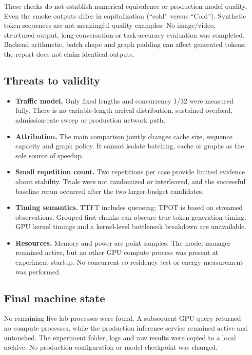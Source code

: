 \documentclass[10pt,a4paper]{article}
\begin{document}
These checks do not establish numerical equivalence or production model quality.
Even the smoke outputs differ in capitalization (``cold'' versus ``Cold'').
Synthetic token sequences are not meaningful quality examples. No image/video,
structured-output, long-conversation or task-accuracy evaluation was completed.
Backend arithmetic, batch shape and graph padding can affect generated tokens;
the report does not claim identical outputs.

\subsection{Threats to validity}
\begin{itemize}
\item \textbf{Traffic model.} Only fixed lengths and concurrency 1/32 were measured
fully. There is no variable-length arrival distribution, sustained overload,
admission-rate sweep or production network path.
\item \textbf{Attribution.} The main comparison jointly changes cache size,
sequence capacity and graph policy. It cannot isolate batching, cache or graphs
as the sole source of speedup.
\item \textbf{Small repetition count.} Two repetitions per case provide limited
evidence about stability. Trials were not randomized or interleaved, and the
successful baseline rerun occurred after the two larger-budget candidates.
\item \textbf{Timing semantics.} TTFT includes queueing; TPOT is based on streamed
observations. Grouped first chunks can obscure true token-generation timing.
GPU kernel timings and a kernel-level bottleneck breakdown are unavailable.
\item \textbf{Resources.} Memory and power are point samples. The model manager
remained active, but no other GPU compute process was present at experiment
startup. No concurrent co-residency test or energy measurement was performed.
\end{itemize}

\subsection{Final machine state}
No remaining live lab processes were found. A subsequent GPU query returned
no compute processes, while the production inference service remained active
and untouched. The experiment folder, logs and raw results were copied to a
local archive. No production configuration or model checkpoint was changed.
\end{document}
